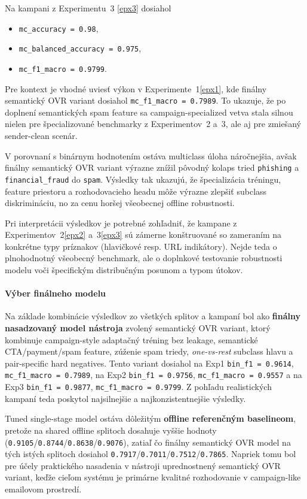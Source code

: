\documentclass[conference]{IEEEtran}
\begin{document}
Na kampani z Experimentu~3 \ref{epx3} dosiahol
\begin{itemize}
    \item \texttt{mc\_accuracy = 0.98},
    \item \texttt{mc\_balanced\_accuracy = 0.975},
    \item \texttt{mc\_f1\_macro = 0.9799}.
\end{itemize}


Pre kontext je vhodné uviesť výkon v Experimente~1\ref{epx1},
kde finálny semantický OVR variant dosiahol \texttt{mc\_f1\_macro = 0.7989}.
To ukazuje, že po doplnení semantických spam feature sa campaign-specialized
vetva stala silnou nielen pre špecializované benchmarky z Experimentov~2 a~3,
ale aj pre zmiešaný sender-clean scenár.

V porovnaní s binárnym hodnotením ostáva multiclass úloha náročnejšia,
avšak finálny semantický OVR variant výrazne znížil pôvodný kolaps tried
\texttt{phishing} a \texttt{financial\_fraud} do \texttt{spam}.
Výsledky tak ukazujú, že špecializácia tréningu, feature priestoru a
rozhodovacieho headu môže výrazne zlepšiť subclass diskrimináciu, no za cenu
horšej všeobecnej offline robustnosti.

Pri interpretácii výsledkov je potrebné zohľadniť, že kampane z
Experimentov~2\ref{epx2} a~3\ref{epx3} sú zámerne konštruované so zameraním na konkrétne
typy príznakov (hlavičkové resp. URL indikátory). Nejde teda o
plnohodnotný všeobecný benchmark, ale o doplnkové testovanie
robustnosti modelu voči špecifickým distribučným posunom a typom útokov.

\paragraph{Výber finálneho modelu}

Na základe kombinácie výsledkov zo všetkých splitov a kampaní bol ako
\textbf{finálny nasadzovaný model nástroja} zvolený semantický OVR variant,
ktorý kombinuje campaign-style adaptačný tréning bez leakage,
semantické CTA/payment/spam feature, zúženie spam triedy,
\textit{one-vs-rest} subclass hlavu a pair-specific hard negatives.
Tento variant dosiahol na Exp1 \texttt{bin\_f1 = 0.9614}, \texttt{mc\_f1\_macro = 0.7989},
na Exp2 \texttt{bin\_f1 = 0.9756}, \texttt{mc\_f1\_macro = 0.9557} a na Exp3
\texttt{bin\_f1 = 0.9877}, \texttt{mc\_f1\_macro = 0.9799}. Z pohľadu realistických
kampaní teda poskytol najsilnejšie a najkonzistentnejšie výsledky.

Tuned single-stage model ostáva dôležitým \textbf{offline referenčným baselineom},
pretože na shared offline splitoch dosahuje vyššie hodnoty
(\texttt{0.9105}/\texttt{0.8744}/\texttt{0.8638}/\texttt{0.9076}), zatiaľ čo
finálny semantický OVR model na tých istých splitoch dosiahol
\texttt{0.7917}/\texttt{0.7011}/\texttt{0.7512}/\texttt{0.7865}. Napriek tomu bol pre účely
praktického nasadenia v nástroji uprednostnený semantický OVR variant,
keďže cieľom systému je primárne kvalitné rozhodovanie v campaign-like emailovom prostredí.
\end{document}
